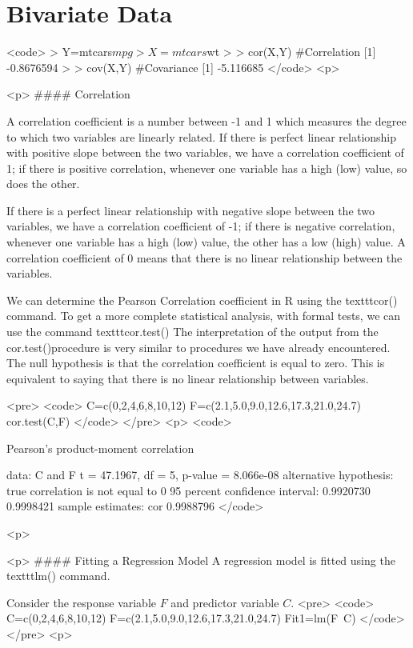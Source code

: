 


\section{Bivariate Data}
 
<code>
> Y=mtcars$mpg
> X=mtcars$wt
>
> cor(X,Y)          #Correlation
[1] -0.8676594
>
> cov(X,Y)          #Covariance
[1] -5.116685
</code>
<p>



<p>
#### {Correlation}

A correlation coefficient is a number between -1 and 1 which measures the degree to which two variables are linearly related. If there is perfect linear relationship with positive slope between the two variables, we have a correlation coefficient of 1; if there is positive correlation, whenever one variable has a high (low) value, so does the other.

If there is a perfect linear relationship with negative slope between the two variables, we have a correlation coefficient of -1; if there is negative correlation, whenever one variable has a high (low) value, the other has a low (high) value.
A correlation coefficient of 0 means that there is no linear relationship between the variables.

We can determine the Pearson Correlation coefficient in R using the texttt{cor()} command.
To get a more complete statistical analysis, with formal tests, we can use the command texttt{cor.test()}
The interpretation of the output from the cor.test()procedure is very similar to procedures we have already encountered. The null hypothesis is that the correlation coefficient is equal to zero. This is equivalent to saying that there is no linear relationship between variables.


<pre>
<code>
C=c(0,2,4,6,8,10,12) 
F=c(2.1,5.0,9.0,12.6,17.3,21.0,24.7)
cor.test(C,F)
</code>
</pre>
<p>
<code>

 Pearson's product-moment correlation

data:  C and F 
t = 47.1967, df = 5, p-value = 8.066e-08
alternative hypothesis: true correlation is not equal to 0 
95 percent confidence interval:
 0.9920730 0.9998421 
sample estimates:
      cor 
0.9988796 
</code>


<p>

<p>
#### {Fitting a Regression Model}
A regression model is fitted using the texttt{lm()} command.

Consider the response variable $F$ and predictor variable $C$.
<pre>
<code>
C=c(0,2,4,6,8,10,12) 
F=c(2.1,5.0,9.0,12.6,17.3,21.0,24.7)
Fit1=lm(F~C)
</code>
</pre>
<p>


